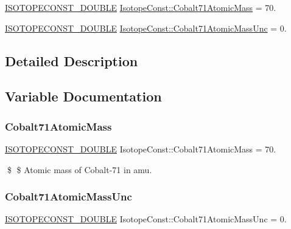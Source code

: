 \begin{DoxyCompactItemize}
\item 
\mbox{\hyperlink{group___isotope_const-_macros_ga8f45a7272ce02c0b4c65c44636ed719a}{I\+S\+O\+T\+O\+P\+E\+C\+O\+N\+S\+T\+\_\+\+D\+O\+U\+B\+LE}} \mbox{\hyperlink{group___isotope_const-_cobalt-_co71_gab36184d78e51a6a7da4cf1c52b8361ca}{Isotope\+Const\+::\+Cobalt71\+Atomic\+Mass}} = 70.
\item 
\mbox{\hyperlink{group___isotope_const-_macros_ga8f45a7272ce02c0b4c65c44636ed719a}{I\+S\+O\+T\+O\+P\+E\+C\+O\+N\+S\+T\+\_\+\+D\+O\+U\+B\+LE}} \mbox{\hyperlink{group___isotope_const-_cobalt-_co71_gafee4418f2e161bc433b14366c47b67bd}{Isotope\+Const\+::\+Cobalt71\+Atomic\+Mass\+Unc}} = 0.
\end{DoxyCompactItemize}


\subsection{Detailed Description}


\subsection{Variable Documentation}
\mbox{\label{group___isotope_const-_cobalt-_co71_gab36184d78e51a6a7da4cf1c52b8361ca}} 
\subsubsection{\texorpdfstring{Cobalt71\+Atomic\+Mass}{Cobalt71AtomicMass}}
{\footnotesize\ttfamily \mbox{\hyperlink{group___isotope_const-_macros_ga8f45a7272ce02c0b4c65c44636ed719a}{I\+S\+O\+T\+O\+P\+E\+C\+O\+N\+S\+T\+\_\+\+D\+O\+U\+B\+LE}} Isotope\+Const\+::\+Cobalt71\+Atomic\+Mass = 70.}

\$ \$ Atomic mass of Cobalt-\/71 in amu. \mbox{\label{group___isotope_const-_cobalt-_co71_gafee4418f2e161bc433b14366c47b67bd}} 
\subsubsection{\texorpdfstring{Cobalt71\+Atomic\+Mass\+Unc}{Cobalt71AtomicMassUnc}}
{\footnotesize\ttfamily \mbox{\hyperlink{group___isotope_const-_macros_ga8f45a7272ce02c0b4c65c44636ed719a}{I\+S\+O\+T\+O\+P\+E\+C\+O\+N\+S\+T\+\_\+\+D\+O\+U\+B\+LE}} Isotope\+Const\+::\+Cobalt71\+Atomic\+Mass\+Unc = 0.}

